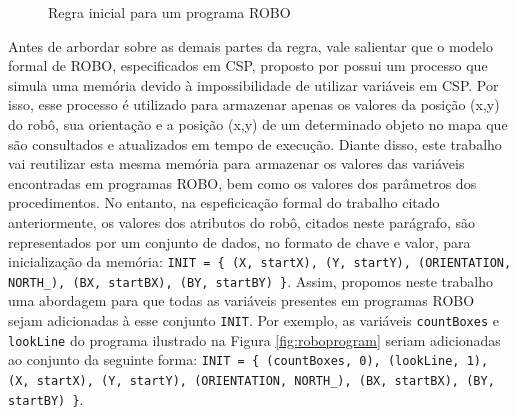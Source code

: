 \begin{figure}[h]
\centering
\caption{Regra inicial para um programa ROBO}

\label{fig:rules}
\end{figure}

Antes de arbordar sobre as demais partes da regra, vale salientar que o modelo formal de ROBO, especificados em CSP, proposto por \cite{nogueira} possui um processo que simula uma memória devido à impossibilidade de utilizar variáveis em CSP. Por isso, esse processo é utilizado para armazenar apenas os valores da posição (x,y) do robô, sua orientação e a posição (x,y) de um determinado objeto no mapa que são consultados e atualizados em tempo de execução. Diante disso, este trabalho vai reutilizar esta mesma memória para armazenar os valores das variáveis encontradas em programas ROBO, bem como os valores dos parâmetros dos procedimentos. No entanto, na espeficicação formal do trabalho citado anteriormente, os valores dos atributos do robô, citados neste parágrafo, são representados por um conjunto de dados, no formato de chave e valor, para inicialização da memória: \texttt{INIT = \{ (X, startX), (Y, startY), (ORIENTATION, NORTH\_), (BX, startBX), (BY, startBY) \}}. Assim, propomos neste trabalho uma abordagem para que todas as variáveis presentes em programas ROBO sejam adicionadas à esse conjunto \texttt{INIT}. Por exemplo, as variáveis \texttt{countBoxes} e \texttt{lookLine} do programa ilustrado na Figura \ref{fig:roboprogram} seriam adicionadas ao conjunto da seguinte forma: \texttt{INIT = \{ (countBoxes, 0), (lookLine, 1), (X, startX), (Y, startY), (ORIENTATION, NORTH\_), (BX, startBX), (BY, startBY) \}}. 

